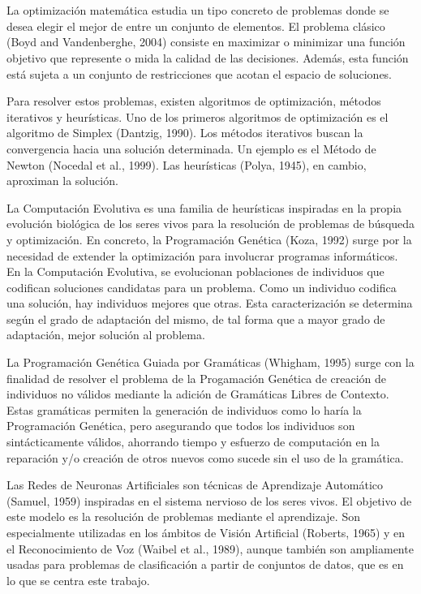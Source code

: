 \documentclass[spanish,a4paper,12pt,twoside]{report}
\begin{document}
  \chapter{\vspace{-3cm}{\LARGE 1. Introducción}}
  \vspace{-1cm}
  La optimización matemática estudia un tipo concreto de problemas donde se desea elegir el mejor de entre un conjunto de elementos. El problema clásico (Boyd and Vandenberghe, 2004) consiste en maximizar o minimizar una función objetivo que represente o mida la calidad de las decisiones. Además, esta función está sujeta a un conjunto de restricciones que acotan el espacio de soluciones. \par
  Para resolver estos problemas, existen algoritmos de optimización, métodos iterativos y heurísticas. Uno de los primeros algoritmos de optimización es el algoritmo de Simplex (Dantzig, 1990). Los métodos iterativos buscan la convergencia hacia una solución determinada. Un ejemplo es el Método de Newton (Nocedal et al., 1999). Las heurísticas (Polya, 1945), en cambio, aproximan la solución. \par
  La Computación Evolutiva es una familia de heurísticas inspiradas en la propia evolución biológica de los seres vivos para la resolución de problemas de búsqueda y optimización. En concreto, la Programación Genética (Koza, 1992) surge por la necesidad de extender la optimización para involucrar programas informáticos. En la Computación Evolutiva, se evolucionan poblaciones de individuos que codifican soluciones candidatas para un problema. Como un individuo codifica una solución, hay individuos mejores que otras. Esta caracterización se determina según el grado de adaptación del mismo, de tal forma que a mayor grado de adaptación, mejor solución al problema. \par
  La Programación Genética Guiada por Gramáticas (Whigham, 1995) surge con la finalidad de resolver el problema de la Progamación Genética de creación de individuos no válidos mediante la adición de Gramáticas Libres de Contexto. Estas gramáticas permiten la generación de individuos como lo haría la Programación Genética, pero asegurando que todos los individuos son sintácticamente válidos, ahorrando tiempo y esfuerzo de computación en la reparación y/o creación de otros nuevos como sucede sin el uso de la gramática. \par
  Las Redes de Neuronas Artificiales son técnicas de Aprendizaje Automático (Samuel, 1959) inspiradas en el sistema nervioso de los seres vivos. El objetivo de este modelo es la resolución de problemas mediante el aprendizaje. Son especialmente utilizadas en los ámbitos de Visión Artificial (Roberts, 1965) y en el Reconocimiento de Voz (Waibel et al., 1989), aunque también son ampliamente usadas para problemas de clasificación a partir de conjuntos de datos, que es en lo que se centra este trabajo. \par
\end{document}
